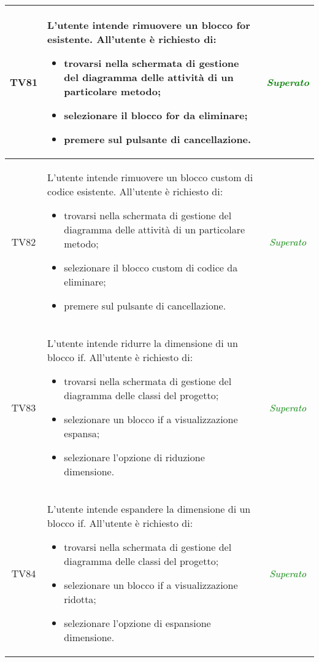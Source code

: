 \begin{longtable}{|c|>{}m{8cm}|c|}
\hypertarget{TV4.11}{TV81} & L'utente intende rimuovere un blocco for esistente.
All'utente è richiesto di:
\begin{itemize}
	\item trovarsi nella schermata di gestione del diagramma delle attività di un particolare metodo;
	\item selezionare il blocco for da eliminare;
	\item premere sul pulsante di cancellazione.
\end{itemize} & \textcolor{Green}{\textit{Superato}}\\ \hline

\hypertarget{TV4.12}{TV82} & L'utente intende rimuovere un blocco custom di codice esistente.
All'utente è richiesto di:
\begin{itemize}
	\item trovarsi nella schermata di gestione del diagramma delle attività di un particolare metodo;
	\item selezionare il blocco custom di codice da eliminare;
	\item premere sul pulsante di cancellazione.
\end{itemize} & \textcolor{Green}{\textit{Superato}}\\ \hline

\hypertarget{TV4.13}{TV83} & L'utente intende ridurre la dimensione di un blocco if.
All'utente è richiesto di:
\begin{itemize}
	\item trovarsi nella schermata di gestione del diagramma delle classi del progetto;
	\item selezionare un blocco if a visualizzazione espansa;
	\item selezionare l'opzione di riduzione dimensione.
\end{itemize} & \textcolor{Green}{\textit{Superato}}\\ \hline

\hypertarget{TV4.14}{TV84} & L'utente intende espandere la dimensione di un blocco if.
All'utente è richiesto di:
\begin{itemize}
	\item trovarsi nella schermata di gestione del diagramma delle classi del progetto;
	\item selezionare un blocco if a visualizzazione ridotta;
	\item selezionare l'opzione di espansione dimensione.
\end{itemize} & \textcolor{Green}{\textit{Superato}}\\ \hline


\end{longtable}
